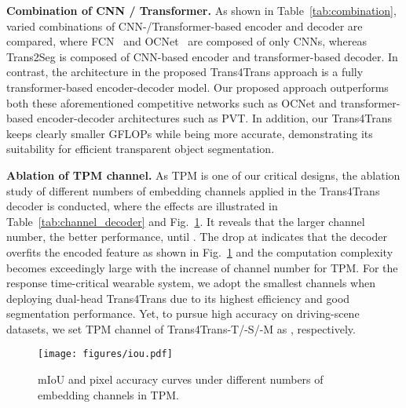 \documentclass[journal]{IEEEtran}
\begin{document}
\noindent\textbf{Combination of CNN / Transformer.}
As shown in Table~\ref{tab:combination}, varied combinations of CNN-/Transformer-based encoder and decoder are compared, where FCN~\cite{fcn} and OCNet~\cite{ocnet} are composed of only CNNs, whereas Trans2Seg is composed of CNN-based encoder and transformer-based decoder. In contrast, the architecture in the proposed Trans4Trans approach is a fully transformer-based encoder-decoder model. Our proposed approach outperforms both these aforementioned competitive networks such as OCNet and transformer-based encoder-decoder architectures such as PVT. In addition, our Trans4Trans keeps clearly smaller GFLOPs while being more accurate, demonstrating its suitability for efficient transparent object segmentation.



\noindent\textbf{Ablation of TPM channel.}
As TPM is one of our critical designs, the ablation study of different numbers of embedding channels applied in the Trans4Trans decoder is conducted, where the effects are illustrated in Table~\ref{tab:channel_decoder} and Fig.~\ref{fig:channel_test_miou}. It reveals that the larger channel number, the better performance, until . The drop at  indicates that the decoder overfits the encoded feature as shown in Fig.~\ref{fig:channel_test_miou} and the computation complexity becomes exceedingly large with the increase of channel number for TPM. For the response time-critical wearable system, we adopt the smallest  channels when deploying dual-head Trans4Trans due to its highest efficiency and good segmentation performance.
Yet, to pursue high accuracy on driving-scene datasets, we set TPM channel of Trans4Trans-T/-S/-M as , respectively.

\begin{figure}[t]
    \centering
    \texttt{[image: figures/iou.pdf]}
\caption{\small mIoU and pixel accuracy curves under different numbers of embedding channels in TPM.}
    \label{fig:channel_test_miou}
\end{figure}

\begin{table}[h]
\centering
{}
\caption{\small Effect of embedding channel in TPM. All tiny Trans4Trans are trained on Trans10K-v2 at  on one GPU. Acc denotes pixel accuracy.}
\label{tab:channel_decoder}
\end{table}
\end{document}
